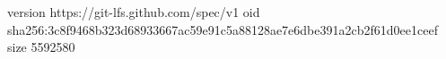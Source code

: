 version https://git-lfs.github.com/spec/v1
oid sha256:3c8f9468b323d68933667ac59e91c5a88128ae7e6dbe391a2cb2f61d0ee1ceef
size 5592580
